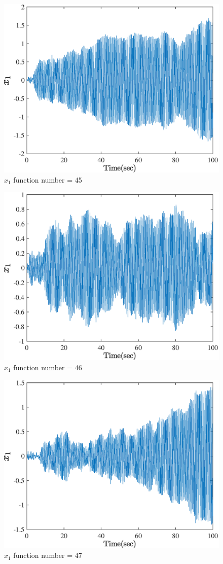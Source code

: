   \begin{figure}[H] 
  	\caption{$x_1$ function number = 45} 
  	\centering 
  	\includegraphics[width=12cm]{../Figure/Q5/part_a/45} 
  \end{figure}
  \begin{figure}[H] 
  	\caption{$x_1$ function number = 46} 
  	\centering 
  	\includegraphics[width=12cm]{../Figure/Q5/part_a/46} 
  \end{figure}
  \begin{figure}[H] 
  	\caption{$x_1$ function number = 47} 
  	\centering 
  	\includegraphics[width=12cm]{../Figure/Q5/part_a/47} 
  \end{figure}
